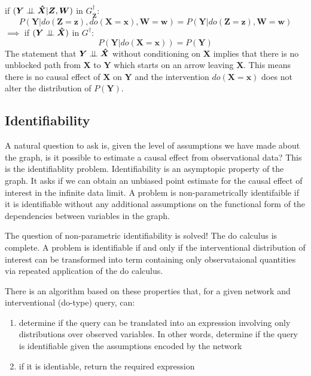 \documentclass[11pt,a4paper,oneside]{book}
\begin{document}
if $(\boldsymbol{Y} \perp\!\!\!\perp \boldsymbol{\hat{X}} |\boldsymbol{Z},\boldsymbol{W})$ in $G^{\dagger}_{\boldsymbol{\overline{Z}}}$:
\begin{equation}
\label{eq:Do3}
P(\boldsymbol{Y}|do(\boldsymbol{Z}=\boldsymbol{z}),do(\boldsymbol{X}=\boldsymbol{x}),\boldsymbol{W}=\boldsymbol{w}) = P(\boldsymbol{Y}|do(\boldsymbol{Z}=\boldsymbol{z}),\boldsymbol{W}=\boldsymbol{w})
\end{equation}
$\implies$ if  $(\boldsymbol{Y} \perp\!\!\!\perp \boldsymbol{\hat{X}})$ in $G^{\dagger}$:
\begin{equation}
\label{eq:Do32}
P(\boldsymbol{Y}|do(\boldsymbol{X}=\boldsymbol{x})) = P(\boldsymbol{Y})
\end{equation}
The statement that $\boldsymbol{Y} \perp\!\!\!\perp \boldsymbol{\hat{X}}$ without conditioning on $\boldsymbol{X}$ implies that there is no unblocked path from $\boldsymbol{X}$ to $\boldsymbol{Y}$ which starts on an arrow leaving $\boldsymbol{X}$. This means there is no causal effect of $\boldsymbol{X}$ on $\boldsymbol{Y}$ and the intervention $do(\boldsymbol{X}=\boldsymbol{x})$ does not alter the distribution of $P(\boldsymbol{Y})$.

\subsection*{Identifiability}
A natural question to ask is, given the level of assumptions we have made about the graph, is it possible to estimate a causal effect from observational data? This is the identifiablity problem. Identifiability is an asymptopic property of the graph. It asks if we can obtain an unbiased point estimate for the causal effect of interest in the infinite data limit. A problem is non-parametrically identifaible if it is identifiable without any additional assumptions on the functional form of the dependencies between variables in the graph. 

The question of non-parametric identifiability is solved! The do calculus is complete. A problem is identifiable if and only if the interventional distribution of interest can be transformed into term containing only observataional quantities via repeated application of the do calculus. 

There is an algorithm \cite{Shpitser2012} based on these properties that, for a given network and interventional (do-type) query, can:

\begin{enumerate}
\item determine if the query can be translated into an expression involving only distributions over observed variables. In other words, determine if the query is identifiable given the assumptions encoded by the network
\item if it is identiable, return the required expression 
\end{enumerate}
\end{document}
